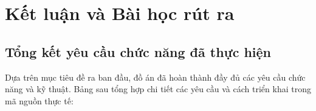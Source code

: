 
\section{Kết luận và Bài học rút ra}

\subsection{Tổng kết yêu cầu chức năng đã thực hiện}

Dựa trên mục tiêu đề ra ban đầu, đồ án đã hoàn thành đầy đủ các yêu cầu chức năng và kỹ thuật. Bảng sau tổng hợp chi tiết các yêu cầu và cách triển khai trong mã nguồn thực tế:

